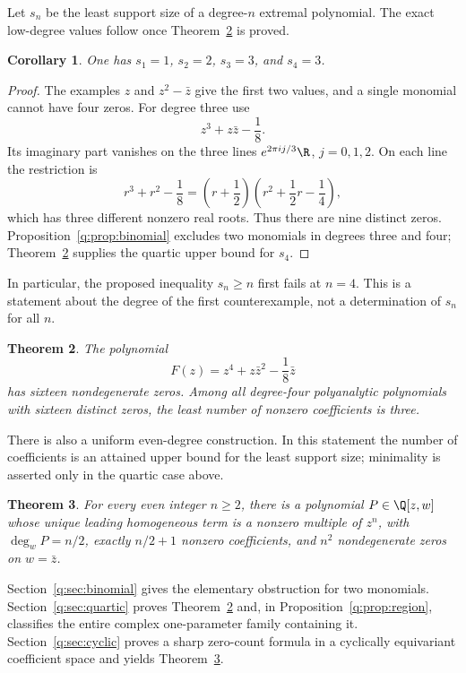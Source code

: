 \documentclass[UTF8,11pt]{ctexart}
\newtheorem{thm}{Theorem}[section]
\newtheorem{cor}[thm]{Corollary}
\theoremstyle{definition}
\numberwithin{equation}{section}
\begin{document}
Let $s_n$ be the least support size of a degree-$n$ extremal polynomial.
The exact low-degree values follow once Theorem~\ref{q:thm:quartic} is proved.
\begin{cor}\label{q:cor:minimaldegree}
One has $s_1=1$, $s_2=2$, $s_3=3$, and $s_4=3$.
\end{cor}
\begin{proof}
The examples $z$ and $z^2-\bar z$ give the first two values, and a single
monomial cannot have four zeros. For degree three use
\[
 z^3+z\bar z-\frac18.
\]
Its imaginary part vanishes on the three lines $e^{2\pi ij/3}\R$,
$j=0,1,2$. On each line the restriction is
\[
 r^3+r^2-\frac18
 =\left(r+\frac12\right)
   \left(r^2+\frac12r-\frac14\right),
\]
which has three different nonzero real roots. Thus there are nine
distinct zeros. Proposition~\ref{q:prop:binomial} excludes two monomials
in degrees three and four; Theorem~\ref{q:thm:quartic} supplies the
quartic upper bound for $s_4$.
\end{proof}

In particular, the proposed inequality $s_n\ge n$ first fails at
$n=4$. This is a statement about the degree of the first counterexample,
not a determination of $s_n$ for all $n$.

\begin{thm}\label{q:thm:quartic}
The polynomial
\begin{equation}\label{q:eq:quartic}
 F(z)=z^4+z\bar z^2-\frac18\bar z
\end{equation}
has sixteen nondegenerate zeros. Among all degree-four polyanalytic
polynomials with sixteen distinct zeros, the least number of nonzero
coefficients is three.
\end{thm}

There is also a uniform even-degree construction. In this statement the
number of coefficients is an attained upper bound for the least support
size; minimality is asserted only in the quartic case above.
\begin{thm}\label{q:thm:even}
For every even integer $n\ge2$, there is a polynomial
$P\in\Q[z,w]$ whose unique leading homogeneous term is a nonzero multiple
of $z^n$, with $\deg_wP=n/2$, exactly $n/2+1$ nonzero coefficients, and
$n^2$ nondegenerate zeros on $w=\bar z$.
\end{thm}

Section~\ref{q:sec:binomial} gives the elementary obstruction for two
monomials. Section~\ref{q:sec:quartic} proves Theorem~\ref{q:thm:quartic}
and, in Proposition~\ref{q:prop:region}, classifies the entire complex
one-parameter family containing it.
Section~\ref{q:sec:cyclic} proves a sharp zero-count formula in a cyclically
equivariant coefficient space and yields Theorem~\ref{q:thm:even}.
\end{document}
